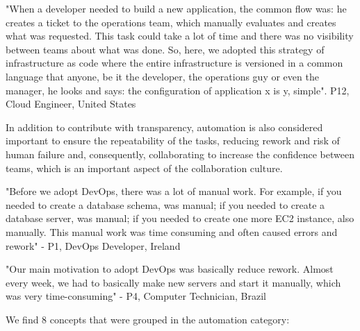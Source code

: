 "When a developer needed to build a new application, the common flow was: he
creates a ticket to the operations team, which manually evaluates and creates
what was requested. This task could take a lot of time and there was no
visibility between teams about what was done. So, here, we adopted this
strategy of infrastructure as code where the entire infrastructure is versioned
in a common language that anyone, be it the developer, the operations guy or
even the manager, he looks and says: the configuration of application x is y,
simple". P12, Cloud Engineer, United States

In addition to contribute with transparency, automation is also considered
important to ensure the repeatability of the tasks, reducing rework and risk of
human failure and, consequently, collaborating to increase the confidence
between teams, which is an important aspect of the collaboration culture.

"Before we adopt DevOps, there was a lot of manual work. For example, if you
needed to create a database schema, was manual; if you needed to create a
database server, was manual; if you needed to create one more EC2 instance,
also manually. This manual work was time consuming and often caused errors and
rework" - P1, DevOps Developer, Ireland

"Our main motivation to adopt DevOps was basically reduce rework. Almost every
week, we had to basically make new servers and start it manually, which was
very time-consuming" - P4, Computer Technician, Brazil

We find 8 concepts that were grouped in the automation category:

